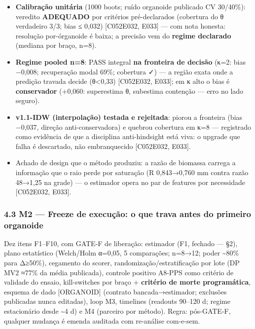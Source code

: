 \documentclass[
  10pt,
]{article}
\providecommand{\tightlist}{%
  \setlength{\itemsep}{0pt}\setlength{\parskip}{0pt}}
\begin{document}
\begin{itemize}
\tightlist
\item
  \textbf{Calibração unitária} (1000 boots; ruído organoide publicado CV
  30/40\%): veredito \textbf{ADEQUADO} por critérios pré-declarados
  (cobertura do θ verdadeiro 3/3; bias ≤ 0,032) {[}C052\textbar E032,
  E033{]} --- com nota honesta: resolução por-órganoide é baixa; a
  precisão vem do \textbf{regime declarado} (mediana por braço, n=8).
\item
  \textbf{Regime pooled n=8}: PASS integral \textbf{na fronteira de
  decisão} (κ=2: bias −0,008; recuperação modal 69\%; cobertura ✓) --- a
  região exata onde a predição travada decide (θ\textless0,33)
  {[}C052\textbar E032, E033{]}; em κ alto o bias é \textbf{conservador}
  (+0,060: superestima θ, subestima contenção --- erro no lado seguro).
\item
  \textbf{v1.1-IDW (interpolação) testada e rejeitada}: piorou a
  fronteira (bias −0,037, direção anti-conservadora) e quebrou cobertura
  em κ=8 --- registrado como evidência de que a disciplina
  anti-hindsight está viva: o upgrade que falha é descartado, não
  embranquecido {[}C052\textbar E032, E033{]}.
\item
  Achado de design que o método produziu: a razão de biomassa carrega a
  informação que o raio perde por saturação (R 0,843→0,760 mm contra
  razão 48→1,25 na grade) --- o estimador opera no par de features por
  necessidade {[}C052\textbar E032, E033{]}.
\end{itemize}

\hypertarget{m2-freeze-de-execuuxe7uxe3o-o-que-trava-antes-do-primeiro-organoide}{%
\subsubsection{4.3 M2 --- Freeze de execução: o que trava antes do
primeiro
organoide}\label{m2-freeze-de-execuuxe7uxe3o-o-que-trava-antes-do-primeiro-organoide}}

Dez itens F1--F10, com GATE-F de liberação: estimador (F1, fechado ---
§2), plano estatístico (Welch/Holm α=0,05, 5 comparações; n=8→12; poder
\textasciitilde80\% para Δ≥50\%), cegamento do scorer,
randomização/estratificação por lote (DP MV2 ≈77\% da média publicada),
controle positivo A8-PPS como critério de validade do ensaio,
kill-switches por braço + \textbf{critério de morte programática},
esquema de dado {[}ORGANOID{]} (contrato bancada→estimador; exclusões
publicadas nunca editadas), loop M3, timelines (readouts 90--120 d;
regime estacionário desde \textasciitilde4 d) e M4 (parceiro por
método). Regra: pós-GATE-F, qualquer mudança é emenda auditada com
re-análise com-e-sem.
\end{document}
